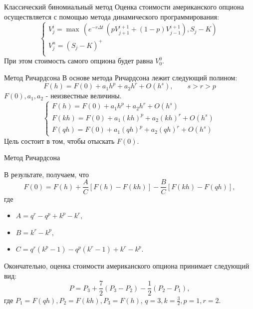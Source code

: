 \documentclass[12pt]{beamer}
\begin{document}
\begin{frame}{Классический биномиальный метод}
    Оценка стоимости американского опциона осуществляется с помощью метода динамического программирования:
    \begin{equation*}
		\begin{cases}
		V_j^i = \max\,(e^{-r\Delta t} \, (pV_{j+1}^{i+1}+(1-p)V_{j-1}^{i+1}),S_j-K) \\
		V_j^n = (S_j-K)^+ \\
		\end{cases}
    \end{equation*}
    При этом стоимость самого опциона будет равна $V_0^0$.
\end{frame}

\begin{frame}{Метод Ричардсона}
    В основе метода Ричардсона лежит следующий полином:
    $$F(h)=F(0)+a_1 h^p + a_2 h^r + O(h^s), \qquad s>r>p$$
    $F(0), a_1, a_2$ - неизвестные величины.
    \begin{equation*}
        \begin{cases}
            F(h)=F(0)+a_1 h^p + a_2 h^r + O(h^s) \\
            F(kh)=F(0)+a_1 (kh)^p + a_2 (kh)^r + O(h^s) \\
            F(qh)=F(0)+a_1 (qh)^p + a_2 (qh)^r + O(h^s)
        \end{cases}
    \end{equation*}
    Цель состоит в том, чтобы отыскать $F(0)$.
\end{frame}

\begin{frame}{Метод Ричардсона}
    \footnotesize{   
        В результате, получаем, что
        $$ F(0) = F(h) + \frac{A}{C} [F(h)-F(kh)] - \frac{B}{C} [F(kh)-F(qh)],$$
        где 
        \begin{itemize}
            \item $A = q^r-q^p+k^p-k^r,$ \\
            \item $B = k^r-k^p,$ \\
            \item $C = q^r(k^p-1)-q^p(k^r-1)+k^r-k^p.$
        \end{itemize}
        Окончательно, оценка стоимости американского опциона принимает следующий вид:
        $$P = P_3 + \frac{7}{2}(P_3-P_2) - \frac{1}{2}(P_2-P_1),$$
        где $P_1=F(qh), P_2=F(kh), P_3=F(h)$, \newline $q=3,k=\frac{3}{2},p=1,r=2$.
    }
\end{frame}
\end{document}
